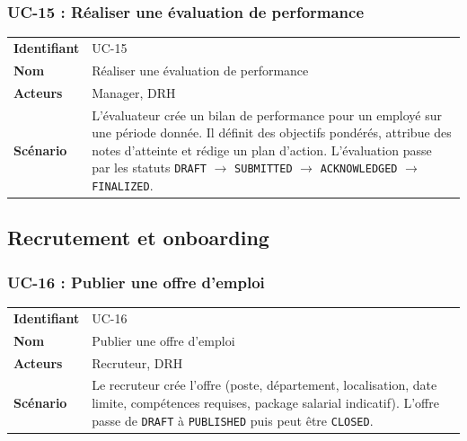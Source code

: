 \documentclass[a4paper,12pt,openany]{book}
\begin{document}
    \subsubsection*{UC-15 : Réaliser une évaluation de performance}
    \begin{table}[H]
        \centering
        \begin{tabularx}{\textwidth}{lX}
    \toprule
    \textbf{Identifiant} & UC-15 \\
    \textbf{Nom}         & Réaliser une évaluation de performance \\
    \textbf{Acteurs}     & Manager, DRH \\
    \midrule
    \textbf{Scénario} & L'évaluateur crée un bilan de performance pour un employé sur une période donnée. Il définit des objectifs pondérés, attribue des notes d'atteinte et rédige un plan d'action. L'évaluation passe par les statuts \texttt{DRAFT} $\rightarrow$ \texttt{SUBMITTED} $\rightarrow$ \texttt{ACKNOWLEDGED} $\rightarrow$ \texttt{FINALIZED}. \\
    \bottomrule
        \end{tabularx}
    \end{table}



    \subsection{Recrutement et onboarding}

    \subsubsection*{UC-16 : Publier une offre d'emploi}
    \begin{table}[H]
        \centering
        \begin{tabularx}{\textwidth}{lX}
    \toprule
    \textbf{Identifiant} & UC-16 \\
    \textbf{Nom}         & Publier une offre d'emploi \\
    \textbf{Acteurs}     & Recruteur, DRH \\
    \midrule
    \textbf{Scénario} & Le recruteur crée l'offre (poste, département, localisation, date limite, compétences requises, package salarial indicatif). L'offre passe de \texttt{DRAFT} à \texttt{PUBLISHED} puis peut être \texttt{CLOSED}. \\
    \bottomrule
        \end{tabularx}
    \end{table}
\end{document}
